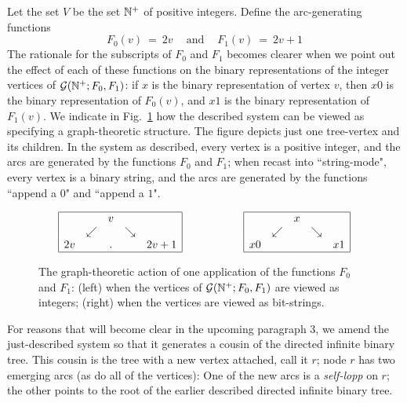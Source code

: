 Let the set $V$ be the set $\mathbb{N}^+$ of positive integers.  Define the arc-generating functions
\[
F_0(v) \ = \ 2v \ \ \ \ \mbox{ and } \ \ \ \ F_1(v) \ = \ 2v+1 \]
The rationale for the subscripts of $F_0$ and $F_1$ becomes clearer when we point out
the effect of each of these functions on the binary representations of the integer vertices of
$\mbox{$\cal G$}(\mathbb{N}^+; F_0, F_1)$: if $x$ is the binary representation of vertex $v$, then $x0$ is the 
binary representation of $F_0(v)$, and $x1$ is the binary representation of $F_1(v)$.
We indicate in Fig.~\ref{fig:one-node-tree} how the described system can be viewed
as specifying a graph-theoretic structure.  The figure depicts just one tree-vertex and its
children.  In the system as described, every vertex is a positive integer, and the arcs are
generated by the functions $F_0$ and $F_1$; when recast into ``string-mode", every vertex
is a binary string, and the arcs are generated by the functions ``append a $0$" and ``append a $1$".
\begin{figure}[hbt]
\[  \begin{array}{ccc}
\begin{array}{|ccccc|}
\hline
     &                & v &                &           \\
     & \swarrow &    & \searrow &           \\
2v &                 &.   &                & 2v+1 \\
\hline
\end{array}
  & \hspace*{.5in} &
\begin{array}{|ccccc|}
\hline
     &                & x  &               &       \\ 
     & \swarrow &    & \searrow &       \\
x0 &                 &   &                & x1 \\
\hline
\end{array}
\end{array}
\]
\caption{The graph-theoretic action of one application of the functions $F_0$ and $F_1$:
(left) when the vertices of $\mbox{$\cal G$}(\mathbb{N}^+; F_0, F_1)$ are viewed as integers; (right) when the vertices
are viewed as bit-strings.}
\label{fig:one-node-tree}
\end{figure}

\medskip

For reasons that will become clear in the upcoming paragraph 3, we amend the just-described
system so that it generates a cousin of the directed infinite binary tree.  This cousin is the tree
with a new vertex attached, call it $r$; node $r$ has two emerging arcs (as do all of the vertices):
One of the new arcs is a {\em self-lopp} on $r$; the other points to the root of the earlier described
directed infinite binary tree.


